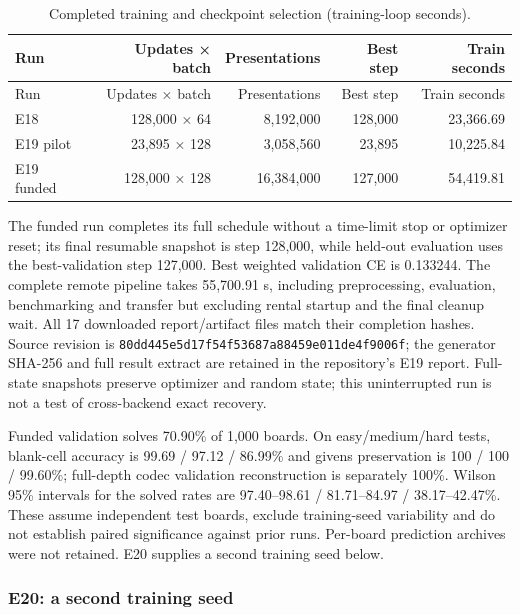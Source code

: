 \documentclass[
  british,
]{article}
\begin{document}
\begin{longtable}[]{@{}lrrrr@{}}
\caption{Completed training and checkpoint selection (training-loop
seconds).}\tabularnewline
\toprule\noalign{}
Run & Updates × batch & Presentations & Best step & Train seconds \\
\midrule\noalign{}
\endfirsthead
\toprule\noalign{}
Run & Updates × batch & Presentations & Best step & Train seconds \\
\midrule\noalign{}
\endhead
\bottomrule\noalign{}
\endlastfoot
E18 & 128,000 × 64 & 8,192,000 & 128,000 & 23,366.69 \\
E19 pilot & 23,895 × 128 & 3,058,560 & 23,895 & 10,225.84 \\
E19 funded & 128,000 × 128 & 16,384,000 & 127,000 & 54,419.81 \\
\end{longtable}

The funded run completes its full schedule without a time-limit stop or
optimizer reset; its final resumable snapshot is step 128,000, while
held-out evaluation uses the best-validation step 127,000. Best weighted
validation CE is 0.133244. The complete remote pipeline takes 55,700.91
s, including preprocessing, evaluation, benchmarking and transfer but
excluding rental startup and the final cleanup wait. All 17 downloaded
report/artifact files match their completion hashes. Source revision is
\texttt{80dd445e5d17f54f53687a88459e011de4f9006f}; the generator SHA-256
and full result extract are retained in the repository's E19 report.
Full-state snapshots preserve optimizer and random state; this
uninterrupted run is not a test of cross-backend exact recovery.

Funded validation solves 70.90\% of 1,000 boards. On easy/medium/hard
tests, blank-cell accuracy is 99.69 / 97.12 / 86.99\% and givens
preservation is 100 / 100 / 99.60\%; full-depth codec validation
reconstruction is separately 100\%. Wilson 95\% intervals for the solved
rates are 97.40--98.61 / 81.71--84.97 / 38.17--42.47\%. These assume
independent test boards, exclude training-seed variability and do not
establish paired significance against prior runs. Per-board prediction
archives were not retained. E20 supplies a second training seed below.

\subsubsection{E20: a second training
seed}\label{e20-a-second-training-seed}
\end{document}
